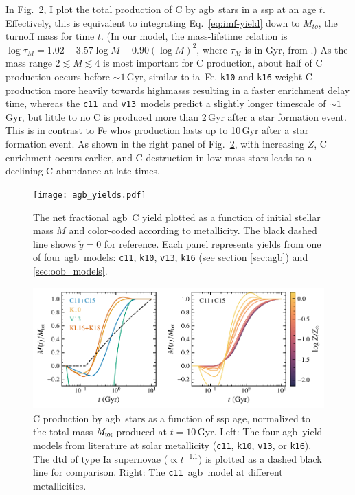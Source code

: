 \documentclass[12pt,oneside,letterpaper]{report}
\newcommand{\agb}{\gls{agb}}
\newcommand{\ia}{\gls{ia}}
\newcommand{\ssp}{\gls{ssp}}
\newcommand{\cxi}{\texttt{\gls{c11}}}
\newcommand{\kx}{\texttt{\gls{k10}}}
\newcommand{\kxvi}{\texttt{\gls{k16}}}
\newcommand{\vxiii}{\texttt{\gls{v13}}}
\newcommand{\about}[1]{${\sim} #1$}
\begin{document}
In Fig.~\ref{fig:agb-ssp}, I plot the total production of C by \agb\ stars in a \ssp{} at an age $t$. 
Effectively, this is equivalent to integrating Eq.~\ref{eq:imf-yield} down to $M_{to}$, the turnoff mass for time $t$.
({In our model, the mass-lifetime relation is
$\log \tau_M = 1.02 - 3.57\log M + 0.90 \left(\log M\right)^2$,
where $\tau_M$ is in Gyr,
from \citealt{larson74}.})
As the mass range $2\lesssim M \lesssim 4$ is most important for C production, about half of C production occurs before \about{1}\,Gyr, similar to \ia\ Fe. 
\kx{} and \kxvi{} weight C production more heavily towards \gls{highmass}s resulting in a faster enrichment delay time, whereas the \cxi\ and \vxiii\ models predict a slightly longer timescale of \about{1}\,Gyr, but little to no C is produced more than 2\,Gyr after a star formation event. This is in contrast to Fe whos production lasts up to 10\,Gyr after a star formation event. As shown in the right panel of Fig.~\ref{fig:agb-ssp}, with increasing $Z$, C enrichment occurs earlier, and C destruction in low-mass stars leads to a declining C abundance at late times.
    

\begin{figure}[htp]
    \centering
 	    \texttt{[image: agb\_yields.pdf]}
        \caption[Low mass C yields]{The net fractional \agb\ C yield  plotted as a function of initial stellar mass $M$ and color-coded according to metallicity. The black dashed line shows $\tilde{y}=0$ for reference. Each panel represents yields from one of four \agb\ models: \cxi, \kx{}, \vxiii{}, \kxvi{} (see section \ref{sec:agb}) and \ref{sec:oob_models}. }
        \label{fig:y_agb}
\end{figure}
\begin{figure}[htp]
    \centering
    \includegraphics[scale=1]{y_agb_t2.pdf}

    \caption[C yields delay time distribution]{
    C production by \agb\ stars as a function of \ssp{} age, normalized to the total mass $M_{\rm tot}$ produced at $t=10$\,Gyr. Left: The four \agb\ yield models from literature at solar metallicity (\cxi, \kx{}, \vxiii{}, or \kxvi{}). The \gls{dtd} of type Ia supernovae ($\propto t^{-1.1}$) is plotted as a dashed black line for comparison. Right: The \cxi\ \agb\ model at different metallicities. }
    \label{fig:agb-ssp}
\end{figure}
\end{document}
